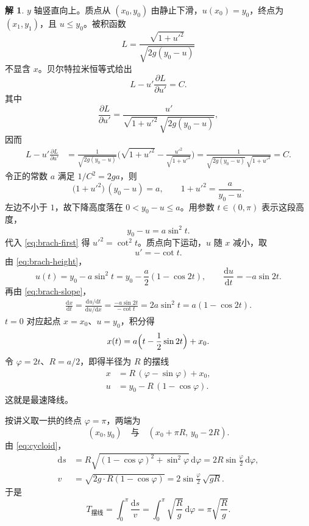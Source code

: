 \documentclass[11pt]{article}
\theoremstyle{remark}
\theoremstyle{definition}
\newtheorem{solution}{解}
\begin{document}
\begin{solution}
$y$ 轴竖直向上。质点从 $(x_0,y_0)$ 由静止下滑，$u(x_0)=y_0$，终点为 $(x_1,y_1)$，且 $u\le y_0$。被积函数
\[
L=\frac{\sqrt{1+u'^2}}{\sqrt{2g(y_0-u)}}
\]
不显含 $x$。贝尔特拉米恒等式给出
\[
L-u'\frac{\partial L}{\partial u'}=C.
\]
其中
\[
\frac{\partial L}{\partial u'}
=\frac{u'}{\sqrt{1+u'^2}\,\sqrt{2g(y_0-u)}},
\]
因而
\begin{align*}
L-u'\frac{\partial L}{\partial u'}
&=\frac{1}{\sqrt{2g(y_0-u)}}
\Biggl(\sqrt{1+u'^2}-\frac{u'^2}{\sqrt{1+u'^2}}\Biggr)
=\frac{1}{\sqrt{2g(y_0-u)}\,\sqrt{1+u'^2}}
=C.
\end{align*}
令正的常数 $a$ 满足 $1/C^2=2ga$，则
\begin{equation}
\bigl(1+u'^2\bigr)\,(y_0-u)=a,
\qquad
1+u'^2=\frac{a}{y_0-u}.
\label{eq:brach-first}
\end{equation}
左边不小于 $1$，故下降高度落在 $0<y_0-u\le a$。用参数 $t\in(0,\pi)$ 表示这段高度，
\begin{equation}
y_0-u=a\sin^2 t.
\label{eq:brach-height}
\end{equation}
代入 \eqref{eq:brach-first} 得 $u'^2=\cot^2 t$。质点向下运动，$u$ 随 $x$ 减小，取
\begin{equation}
u'=-\cot t.
\label{eq:brach-slope}
\end{equation}
由 \eqref{eq:brach-height}，
\[
u(t)=y_0-a\sin^2 t=y_0-\frac{a}{2}(1-\cos 2t),
\qquad
\frac{\mathrm{d}u}{\mathrm{d}t}=-a\sin 2t.
\]
再由 \eqref{eq:brach-slope}，
\begin{align*}
\frac{\mathrm{d}x}{\mathrm{d}t}
=\frac{\mathrm{d}u/\mathrm{d}t}{\mathrm{d}u/\mathrm{d}x}
=\frac{-a\sin 2t}{-\cot t}
=2a\sin^2 t
=a(1-\cos 2t).
\end{align*}
$t=0$ 对应起点 $x=x_0$、$u=y_0$，积分得
\[
x(t)=a\Bigl(t-\frac12\sin 2t\Bigr)+x_0.
\]
令 $\varphi=2t$、$R=a/2$，即得半径为 $R$ 的摆线
\begin{equation}
\begin{aligned}
x&=R\,(\varphi-\sin\varphi)+x_0,\\
u&=y_0-R\,(1-\cos\varphi).
\end{aligned}
\label{eq:cycloid}
\end{equation}
这就是最速降线。

按讲义取一拱的终点 $\varphi=\pi$，两端为
\[
(x_0,y_0)
\quad\text{与}\quad
(x_0+\pi R,\, y_0-2R).
\]
由 \eqref{eq:cycloid}，
\begin{align*}
\mathrm{d}s
&=R\sqrt{(1-\cos\varphi)^2+\sin^2\varphi}\,\mathrm{d}\varphi
=2R\sin\frac{\varphi}{2}\,\mathrm{d}\varphi,\\
v
&=\sqrt{2g\cdot R(1-\cos\varphi)}
=2\sin\frac{\varphi}{2}\,\sqrt{gR}.
\end{align*}
于是
\[
T_{\text{摆线}}
=\int_0^{\pi}\frac{\mathrm{d}s}{v}
=\int_0^{\pi}\sqrt{\frac{R}{g}}\,\mathrm{d}\varphi
=\pi\sqrt{\frac{R}{g}}.
\]


\end{solution}
\end{document}

